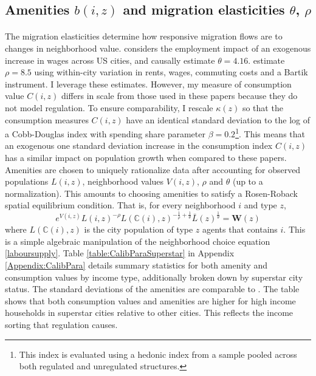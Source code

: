 \documentclass[12pt]{article}
\begin{document}
\subsection{Amenities $b(i, z)$ and migration elasticities $\theta$, $\rho$}\label{Calibration:Amenities} 
\paragraph*{}
The migration elasticities determine how responsive migration flows are to changes in neighborhood value. \cite{morettihornbeck} considers the employment impact of an exogenous increase in wages across US cities, and causally estimate $\theta = 4.16$. \cite{BSH} estimate $\rho = 8.5$ using within-city variation in rents, wages, commuting costs and a Bartik instrument. I leverage these estimates. However, my measure of consumption value $C(i, z)$ differs in scale from those used in these papers because they do not model regulation. To ensure comparability, I rescale $\kappa(z)$ so that the consumption measures $C(i, z)$ have an identical standard deviation to the log of a Cobb-Douglas index with spending share parameter $\beta = 0.2$\footnote{This index is evaluated using a hedonic index from a sample pooled across both regulated and unregulated structures.}. This means that an exogenous one standard deviation increase in the consumption index $C(i, z)$ has a similar impact on population growth when compared to these papers. Amenities are chosen to uniquely rationalize data after accounting for observed populations $L(i, z)$, neighborhood values $V(i, z)$, $\rho$ and $\theta$ (up to a normalization). This amounts to choosing amenities to satisfy a Rosen-Roback spatial equilibrium condition. That is, for every neighborhood $i$ and type $z$,
\begin{equation}\label{RosenRobackCalibrate}
 e^{V(i, z)}L(i, z)^{-\rho}L(\mathbb{C}(i), z)^{-\frac{1}{\rho} + \frac{1}{\theta}}\bar{L}(z)^{\frac{1}{\theta}} = \boldsymbol{W}(z) 
\end{equation}
 where $L(\mathbb{C}(i), z)$ is the city population of type $z$ agents that contains $i$. This is a simple algebraic manipulation of the neighborhood choice equation \eqref{laboursupply}. Table \ref{table:CalibParaSuperstar} in Appendix \ref{Appendix:CalibPara} details summary statistics for both amenity and consumption values by income type, additionally broken down by superstar city status. The standard deviations of the amenities are comparable to \cite{hseihmoretti}.  The table shows that both consumption values and amenities are higher for high income households in superstar cities relative to other cities. This reflects the income sorting that regulation causes.
\end{document}
